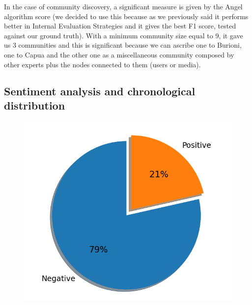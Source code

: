 \documentclass[sigchi]{acmart}
\begin{document}
In the case of community discovery, a significant measure is given by the Angel algorithm score (we decided to use this because as we previously said it performs better in Internal Evaluation Strategies and it gives the best F1 score, tested against our ground truth). With a minimum community size equal to 9, it gave us 3 communities and this is significant because we can ascribe one to Burioni, one to Capua and the other one as a miscellaneous community composed by other experts plus the nodes connected to them (users or media).


\subsection{Sentiment analysis and chronological distribution}

\begin{figure}[htbp!]
  \includegraphics[width=.5\linewidth]{img/Results/SentimentAnalysis_pie.png}
\end{figure}
\end{document}
